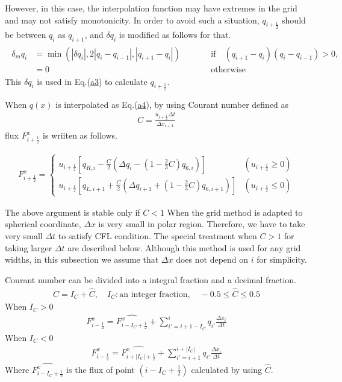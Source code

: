 However, in this case, the interpolation function may have extremes in the grid and may not satisfy monotonicity. In order to avoid such a situation, \(q_{i+\frac{1}{2}}\) should be between \(q_{i}\)
as \(q_{i+1}\), and \(\delta q_{i}\) is modified as follows for that. \begin{eqnarray}
\begin{aligned}
\delta_{m} q_{i} & =\min(|\delta
q_{i}|,2|q_{i}-q_{i-1}|,|q_{i+1}-q_{i}|) && \qquad \text{if$\quad(q_{i+1}-q_{i})(q_{i}-q_{i-1}) >0$}, \\
& =0 && \qquad \text{otherwise}
\end{aligned}
\end{eqnarray} This \(\delta q_{i}\) is used in Eq.(\url{a3}) to calculate \(q_{i+\frac{1}{2}}\).

When \(q(x)\) is interpolated as Eq.(\url{a4}), by using Courant number defined as \begin{eqnarray}C=\frac{u_{i+\frac{1}{2}}\Delta t}{\Delta x_{i+1}}\end{eqnarray} flux \(F^{x}_{i+\frac{1}{2}}\) is wriiten as follows.

\begin{eqnarray}
F^{x}_{i+\frac{1}{2}}=\begin{cases}u_{i+\frac{1}{2}}[q_{R,i}-\frac{C}{2}(\Delta q_{i}-(1-\frac{2}{3}C)q_{6,i})] & (u_{i+\frac{1}{2}}\ge0)\\
  u_{i+\frac{1}{2}}[q_{L,i+1}+\frac{C}{2}(\Delta q_{i+1}+(1-\frac{2}{3}C)q_{6,i+1})] & (u_{i+\frac{1}{2}}\leq0)
  \end{cases}
\end{eqnarray}

The above argument is stable only if \(C<1\) When the grid method is adapted to spherical coordinate, \(\Delta x\) is very small in polar region. Therefore, we have to take very small \(\Delta t\) to
satisfy CFL condition. The special treatment when \(C>1\) for taking larger \(\Delta t\) are described below. Although this method is used for any grid widths, in this subsection we assume that
\(\Delta x\) does not depend on \(i\) for simplicity.

Courant number can be divided into a integral fraction and a decimal fraction. \begin{eqnarray}C=I_{C}+\hat{C},\quad I_{C}: \text{an integer fraction},\quad -0.5\le \hat{C} \le 0.5\end{eqnarray} When \(I_{C}>0\)
\begin{eqnarray}F^{x}_{i-\frac{1}{2}}=\hat{F^{x}_{i-I_{C}+\frac{1}{2}}}+\sum^{i}_{i'=i+1-I_{C}} q_{i'} \frac{\Delta x_{i}}{\Delta t}\end{eqnarray} When \(I_{C}<0\)
\begin{eqnarray}F^{x}_{i-\frac{1}{2}}=\hat{F^{x}_{i+|I_{C}|+\frac{1}{2}}}+\sum^{i+|I_{C}|}_{i'=i+1} q_{i'} \frac{\Delta x_{i}}{\Delta t}\end{eqnarray} Where \(\hat{F^{x}_{i-I_{C}+\frac{1}{2}}}\) is the flux of point
\((i-I_{C}+\frac{1}{2})\) calculated by using \(\hat{C}\).

